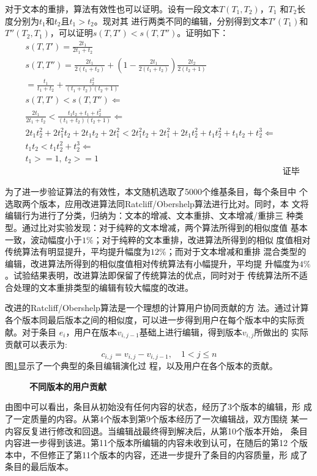 对于文本的重排，算法有效性也可以证明。设有一段文本$T(T_1,T_2)$，$T_1$
和$T_2$长度分别为$t_1$和$t_2$且$t_1>t_2$。现对其
进行两类不同的编辑，分别得到文本$T'(T_1)$和$T''(T_2,T_1)$，可以证明$s(T,T')<s(T,T'')$。证明如下：
\begin{eqnarray*}
  \label{eq:3}
&s(T,T')=\frac{2t_1}{2t_1+t_2}& \\
&s(T,T'')=\frac{2t_1}{2(t_1+t_2)}+(1-\frac{2t_1}{2(t_1+t_2)})\frac{2t_2}{2(t_2+1)}&\\
         &=\frac{t_1}{t_1+t_2}+\frac{t_2^2}{(t_1+t_2)(t_2+1)}& \\
&s(T,T')<s(T,T'') \Leftarrow&   \\
&\frac{2t_1}{2t_1+t_2}<\frac{t_1t_2+t_1+t_2^2}{(t_1+t_2)(t_2+1)} \Leftarrow& \\
&2t_1t_2^2+2t_1^2t_2+2t_1t_2+2t_1^2<2t_1^2t_2+2t_1^2+2t_1t_2^2+t_1t_2^2+t_1t_2+t_2^3
\Leftarrow & \\
&t_1t_2<t_1t_2^2+t_2^3  \Leftarrow& \\
& t_1>=1, \ t_2>=1& \\
&&\text{证毕}
\end{eqnarray*}

为了进一步验证算法的有效性，本文随机选取了5000个维基条目，每个条目中
个选取两个版本，应用改进算法同Ratcliff/Obershelp算法进行比对。同时，本
文将编辑行为进行了分类，归纳为：文本的增减、文本重排、文本增减/重排三
种类型。通过比对实验发现：对于纯粹的文本增减，两个算法所得到的相似度值
基本一致，波动幅度小于$1\%$；对于纯粹的文本重排，改进算法所得到的相似
度值相对传统算法有明显提升，平均提升幅度为$12\%$；而对于文本增减和重排
混合类型的编辑，改进算法所得到的相似度值相对传统算法有小幅提升，平均提
升幅度为$4\%$。试验结果表明，改进算法即保留了传统算法的优点，同时对于
传统算法所不适合处理的文本重排类型的编辑有较大幅度的改进。

改进的Ratcliff/Obershelp算法是一个理想的计算用户协同贡献的方
法。通过计算
各个版本同最后版本之间的相似度，可以进一步得到用户在每个版本中的实际贡献。对于条目
$e_i$，用户在版本$v_{i,j-1}$基础上进行编辑，得到版本$v_{i,j}$所做出的
实际贡献可以表示为:
\[
c_{i,j}=v_{i,j}-v_{i,j-1}, \quad 1<j \leq n
\]
图\ref{fig:contribution}显示了一个典型的条目编辑演化过
程，以及用户在各个版本的贡献。
\begin{figure}[htp]
  \centering
 
  \caption{\small{\bf{不同版本的用户贡献}}}
  \label{fig:contribution}
\end{figure}

由图中可以看出，条目从初始没有任何内容的状态，经历了3个版本的编辑，形
成了一定质量的内容。从第4个版本到第9个版本经历了一次编辑战，双方围绕
某一内容反复进行修改和回退。当编辑战最终得到解决后，从第10个版本开始，
条目内容进一步得到该进。第11个版本所编辑的内容未收到认可，在随后的第12
个版本中，不但修正了第11个版本的内容，还进一步提升了条目的内容质量，形
成了条目的最后版本。


